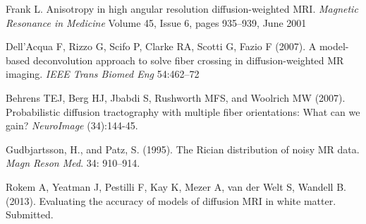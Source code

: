 \documentclass[11pt]{article}
\begin{document}
Frank L. Anisotropy in high angular resolution diffusion-weighted
MRI.  \emph{Magnetic Resonance in Medicine} Volume 45, Issue 6, pages
935–939, June 2001

Dell’Acqua F, Rizzo G, Scifo P, Clarke RA, Scotti G, Fazio F (2007). A
model-based deconvolution approach to solve fiber crossing in
diffusion-weighted MR imaging. {\it IEEE Trans Biomed Eng} 54:462–72

Behrens TEJ, Berg HJ, Jbabdi S, Rushworth MFS, and Woolrich MW (2007).  Probabilistic
diffusion tractography with multiple fiber orientations: What can we
gain?  {\it NeuroImage} (34):144-45.

Gudbjartsson, H., and Patz, S. (1995). The Rician distribution of noisy MR
data. {\it Magn Reson Med}. 34: 910–914.

Rokem A, Yeatman J, Pestilli F, Kay K, Mezer A, van der Welt S,
Wandell B.  (2013). Evaluating the accuracy of models of diffusion MRI
in white matter.  Submitted.
\end{document}
